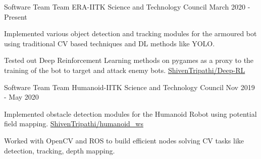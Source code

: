 \begin{cventries}

\cventry
  {Software Team}
  {Team ERA-IITK}
  {Science and Technology Council}
  {March 2020 - Present}
  {
     \begin{cvitems}
     \item {Implemented various object detection and tracking modules for the armoured bot using traditional CV based techniques and DL methods like YOLO.}
     \item {Tested out Deep Reinforcement Learning methods on pygames as a proxy to the training of the bot to target and attack enemy bots. \selectfont \href{https://github.com/ShivenTripathi/Deep-RL}{ShivenTripathi/Deep-RL} }
    \end{cvitems}
  }
\cventry
  {Software Team}
  {Team Humanoid-IITK}
  {Science and Technology Council}
  {Nov 2019 - May 2020}
  {
     \begin{cvitems}
     \item {Implemented obstacle detection modules for the Humanoid Robot using potential field mapping. \selectfont \href{https://github.com/ShivenTripathi/humanoid_ws}{ShivenTripathi/humanoid\_ws}}
     \item {Worked with OpenCV and ROS to build efficient nodes solving CV tasks like detection, tracking, depth mapping.}
     \end{cvitems}
  }
\end{cventries}
